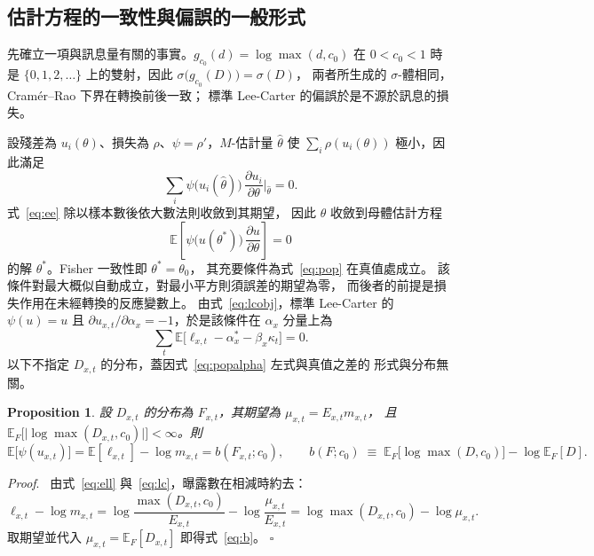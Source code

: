 \documentclass[UTF8, fontset=macnew, a4paper, 12pt]{ctexart}
\newtheorem{prop}{Proposition}
\newenvironment{proof}{\par\noindent\textit{Proof}.\ }{\hfill$\square$\par\vspace{4pt}}
\newcommand{\Ex}{\mathbb{E}}
\begin{document}
\subsection{估計方程的一致性與偏誤的一般形式}\label{subsec:consistency}\label{subsec:mixrep}

先確立一項與訊息量有關的事實。$g_{c_0}(d)=\log\max(d,c_0)$ 在 $0<c_0<1$ 時是
$\{0,1,2,\dots\}$ 上的雙射，因此 $\sigma\bigl(g_{c_0}(D)\bigr)=\sigma(D)$，
兩者所生成的 $\sigma$-體相同，Cramér--Rao 下界在轉換前後一致；
標準 Lee-Carter 的偏誤於是不源於訊息的損失。

設殘差為 $u_i(\theta)$、損失為 $\rho$、$\psi=\rho'$，$M$-估計量 $\hat\theta$
使 $\sum_i\rho(u_i(\theta))$ 極小，因此滿足
\begin{equation}\label{eq:ee}
\sum_i \psi\big(u_i(\hat\theta)\big)\,
\frac{\partial u_i}{\partial\theta}\Big|_{\hat\theta}=0 .
\end{equation}
式~\eqref{eq:ee} 除以樣本數後依大數法則收斂到其期望，
因此 $\hat\theta$ 收斂到母體估計方程
\begin{equation}\label{eq:pop}
\Ex\!\left[\psi\big(u(\theta^{\ast})\big)\,
\frac{\partial u}{\partial\theta}\right]=0
\end{equation}
的解 $\theta^{\ast}$。Fisher 一致性即 $\theta^{\ast}=\theta_0$，
其充要條件為式~\eqref{eq:pop} 在真值處成立。
該條件對最大概似自動成立，對最小平方則須誤差的期望為零，
而後者的前提是損失作用在未經轉換的反應變數上。
由式~\eqref{eq:lcobj}，標準 Lee-Carter 的 $\psi(u)=u$ 且
$\partial u_{x,t}/\partial\alpha_x=-1$，於是該條件在 $\alpha_x$ 分量上為
\begin{equation}\label{eq:popalpha}
\sum_{t}\Ex\big[\ell_{x,t}-\alpha_x^{\ast}-\beta_x\kappa_t\big]=0 .
\end{equation}
以下不指定 $D_{x,t}$ 的分布，蓋因式~\eqref{eq:popalpha} 左式與真值之差的
形式與分布無關。

\begin{prop}\label{prop:fisher}
設 $D_{x,t}$ 的分布為 $F_{x,t}$，其期望為 $\mu_{x,t}=E_{x,t}m_{x,t}$，
且 $\Ex_{F}\bigl[\lvert\log\max(D_{x,t},c_0)\rvert\bigr]<\infty$。則
\begin{equation}\label{eq:b}
\Ex\big[\psi(u_{x,t})\big]=\Ex[\ell_{x,t}]-\log m_{x,t}=b(F_{x,t};c_0),
\qquad
b(F;c_0)\;\equiv\;\Ex_{F}\big[\log\max(D,c_0)\big]-\log\Ex_{F}[D] .
\end{equation}
\end{prop}

\begin{proof}
由式~\eqref{eq:ell} 與~\eqref{eq:lc}，曝露數在相減時約去：
\begin{equation}\label{eq:pf1}
\ell_{x,t}-\log m_{x,t}
=\log\frac{\max(D_{x,t},c_0)}{E_{x,t}}-\log\frac{\mu_{x,t}}{E_{x,t}}
=\log\max(D_{x,t},c_0)-\log\mu_{x,t} .
\end{equation}
取期望並代入 $\mu_{x,t}=\Ex_{F}[D_{x,t}]$ 即得式~\eqref{eq:b}。
\end{proof}
\end{document}

